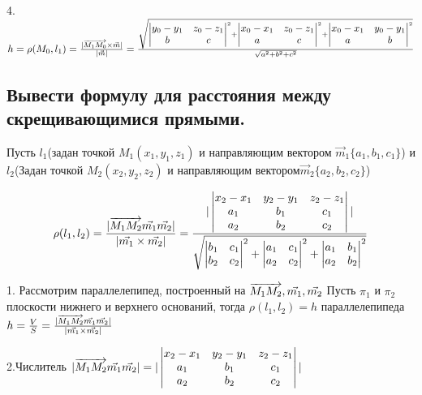 4.$h = \rho(M_0, l_1) = \frac{ |\overrightarrow{M_1M_0}\times\vec{m}| }{ |\vec{m}| } = 
\frac{\sqrt{\begin{vmatrix}y_0-y_1&z_0-z_1\\b&c\end{vmatrix}^2+
\begin{vmatrix}x_0-x_1&z_0-z_1\\a&c\end{vmatrix}^2+
\begin{vmatrix}x_0-x_1&y_0-y_1\\a&b\end{vmatrix}^2}}{\sqrt{a^2+b^2+c^2}}$

\subsection{Вывести формулу для расстояния между скрещивающимися прямыми.}

Пусть $l_1$(задан точкой $M_1(x_1, y_1, z_1)$ и направляющим вектором $\vec{m}_1\{a_1,b_1,c_1\}$) и 
$l_2$(Задан точкой $M_2(x_2, y_2, z_2)$ и направляющим вектором$\vec{m}_2\{a_2,b_2,c_2\}$)

$$\rho(l_1, l_2) = \frac{ |\overrightarrow{M_1M_2}\vec{m_1}\vec{m_2}| }{ |\vec{m_1}\times\vec{m_2}| }=
\frac{ |\begin{vmatrix}x_2-x_1&y_2-y_1&z_2-z_1\\a_1&b_1&c_1\\a_2&b_2&c_2\end{vmatrix}| }
    {\sqrt{\begin{vmatrix}b_1&c_1\\b_2&c_2\end{vmatrix}^2+
    \begin{vmatrix}a_1&c_1\\a_2&c_2\end{vmatrix}^2+
    \begin{vmatrix}a_1&b_1\\a_2&b_2\end{vmatrix}^2}}$$

1. Рассмотрим параллелепипед, построенный на $\overrightarrow{M_1M_2}, \vec{m_1}, \vec{m_2}$
Пусть $\pi_1$ и $\pi_2$ плоскости нижнего и верхнего оснований, тогда $\rho(l_1, l_2) = h$ параллелепипеда
$h = \frac{V}{S} = \frac{ |\overrightarrow{M_1M_2}\vec{m_1}\vec{m_2}| }{ |\vec{m_1}\times\vec{m_2}| }$

2.Числитель $|\overrightarrow{M_1M_2}\vec{m_1}\vec{m_2}| =  |\begin{vmatrix}x_2-x_1&y_2-y_1&z_2-z_1\\
a_1&b_1&c_1\\a_2&b_2&c_2\end{vmatrix}|$

